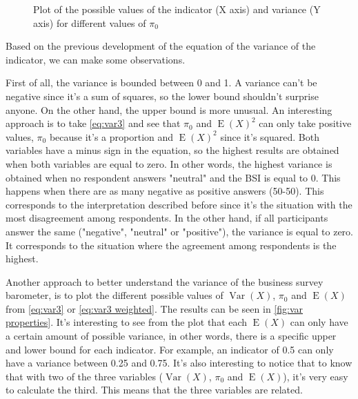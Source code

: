 \documentclass[12pt,a4paper,oneside]{book}
\DeclareMathOperator{\Var}{Var}
\DeclareMathOperator{\E}{E}
\begin{document}
\begin{figure}[hbt!]
    \caption{Plot of the possible values of the indicator (X axis) and variance (Y axis) for different values of $\pi_0$ }
    \label{fig:var properties}
\end{figure}


Based on the previous development of the equation of the variance of the indicator, we can make some observations.

First of all, the variance is bounded between 0 and 1. 
A variance can't be negative since it's a sum of squares, so the lower bound shouldn't surprise anyone. On the other hand, the upper bound is more unusual. 
An interesting approach is to take  \autoref{eq:var3} and see that $\pi_0$ and $\E(X)^2$ can only take positive values, $\pi_0$ because it's a proportion and $\E(X)^2$ since it's squared. 
Both variables have a minus sign in the equation, so the highest results are obtained when both variables are equal to zero.
In other words, the highest variance is obtained when no respondent answers "neutral" and the BSI is equal to 0. 
This happens when there are as many negative as positive answers (50-50).
This corresponds to the interpretation described before since it's the situation with the most disagreement among respondents.
In the other hand, if all participants answer the same ("negative", "neutral" or "positive"), the variance is equal to zero.
It corresponds to the situation where the agreement among respondents is the highest.

Another approach to better understand the variance of the business survey barometer, is to plot the different possible values of $\Var(X)$, $\pi_0$ and $\E(X)$ from \autoref{eq:var3} or \autoref{eq:var3 weighted}. The results can be seen in \autoref{fig:var properties}.
It's interesting to see from the plot that each $\E(X)$ can only have a certain amount of possible variance, in other words, there is a specific upper and lower bound for each indicator. For example, an indicator of 0.5 can only have a variance between 0.25 and 0.75.
It's also interesting to notice that to know that with two of the three variables ($\Var(X)$, $\pi_0$ and $\E(X)$), it's very easy to calculate the third. This means that the three variables are related.
\end{document}
